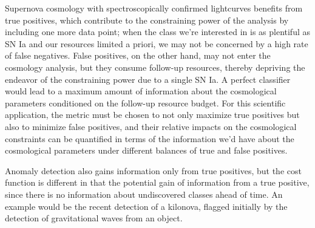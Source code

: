Supernova cosmology with spectroscopically confirmed lightcurves benefits from true positives, which contribute to the constraining power of the analysis by including one more data point; when the class we're interested in is as plentiful as SN Ia and our resources limited a priori, we may not be concerned by a high rate of false negatives.
False positives, on the other hand, may not enter the cosmology analysis, but they consume follow-up resources, thereby depriving the endeavor of the constraining power due to a single SN Ia.
A perfect classifier would lead to a maximum amount of information about the cosmological parameters conditioned on the follow-up resource budget.
For this scientific application, the metric must be chosen to not only maximize true positives but also to minimize false positives, and their relative impacts on the cosmological constraints can be quantified in terms of the information we'd have about the cosmological parameters under different balances of true and false positives.

Anomaly detection also gains information only from true positives, but the cost function is different in that the potential gain of information from a true positive, since there is no information about undiscovered classes ahead of time. An example would be the recent detection of a kilonova, flagged initially by the detection of gravitational waves from an object.

